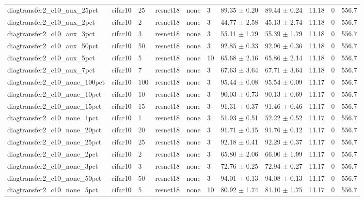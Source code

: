 \begin{tabular}{lllllllllll}
diagtransfer2_c10_aux_25pct & cifar10 & 25 & resnet18 & none & 3 & 89.35 $\pm$ 0.20 & 89.44 $\pm$ 0.24 & 11.18 & 0 & 556.7 \\
diagtransfer2_c10_aux_2pct & cifar10 & 2 & resnet18 & none & 3 & 44.77 $\pm$ 2.58 & 45.13 $\pm$ 2.74 & 11.18 & 0 & 556.7 \\
diagtransfer2_c10_aux_3pct & cifar10 & 3 & resnet18 & none & 3 & 55.11 $\pm$ 1.79 & 55.39 $\pm$ 1.79 & 11.18 & 0 & 556.7 \\
diagtransfer2_c10_aux_50pct & cifar10 & 50 & resnet18 & none & 3 & 92.85 $\pm$ 0.33 & 92.96 $\pm$ 0.36 & 11.18 & 0 & 556.7 \\
diagtransfer2_c10_aux_5pct & cifar10 & 5 & resnet18 & none & 10 & 65.68 $\pm$ 2.16 & 65.86 $\pm$ 2.14 & 11.18 & 0 & 556.7 \\
diagtransfer2_c10_aux_7pct & cifar10 & 7 & resnet18 & none & 3 & 67.63 $\pm$ 3.64 & 67.71 $\pm$ 3.64 & 11.18 & 0 & 556.7 \\
diagtransfer2_c10_none_100pct & cifar10 & 100 & resnet18 & none & 3 & 95.44 $\pm$ 0.08 & 95.54 $\pm$ 0.09 & 11.17 & 0 & 556.7 \\
diagtransfer2_c10_none_10pct & cifar10 & 10 & resnet18 & none & 3 & 90.03 $\pm$ 0.73 & 90.13 $\pm$ 0.69 & 11.17 & 0 & 556.7 \\
diagtransfer2_c10_none_15pct & cifar10 & 15 & resnet18 & none & 3 & 91.31 $\pm$ 0.37 & 91.46 $\pm$ 0.46 & 11.17 & 0 & 556.7 \\
diagtransfer2_c10_none_1pct & cifar10 & 1 & resnet18 & none & 3 & 51.93 $\pm$ 0.51 & 52.22 $\pm$ 0.52 & 11.17 & 0 & 556.7 \\
diagtransfer2_c10_none_20pct & cifar10 & 20 & resnet18 & none & 3 & 91.71 $\pm$ 0.15 & 91.76 $\pm$ 0.12 & 11.17 & 0 & 556.7 \\
diagtransfer2_c10_none_25pct & cifar10 & 25 & resnet18 & none & 3 & 92.18 $\pm$ 0.41 & 92.29 $\pm$ 0.37 & 11.17 & 0 & 556.7 \\
diagtransfer2_c10_none_2pct & cifar10 & 2 & resnet18 & none & 3 & 65.80 $\pm$ 2.06 & 66.00 $\pm$ 1.99 & 11.17 & 0 & 556.7 \\
diagtransfer2_c10_none_3pct & cifar10 & 3 & resnet18 & none & 3 & 72.76 $\pm$ 0.25 & 72.94 $\pm$ 0.27 & 11.17 & 0 & 556.7 \\
diagtransfer2_c10_none_50pct & cifar10 & 50 & resnet18 & none & 3 & 94.01 $\pm$ 0.13 & 94.08 $\pm$ 0.13 & 11.17 & 0 & 556.7 \\
diagtransfer2_c10_none_5pct & cifar10 & 5 & resnet18 & none & 10 & 80.92 $\pm$ 1.74 & 81.10 $\pm$ 1.75 & 11.17 & 0 & 556.7 \\

\end{tabular}
